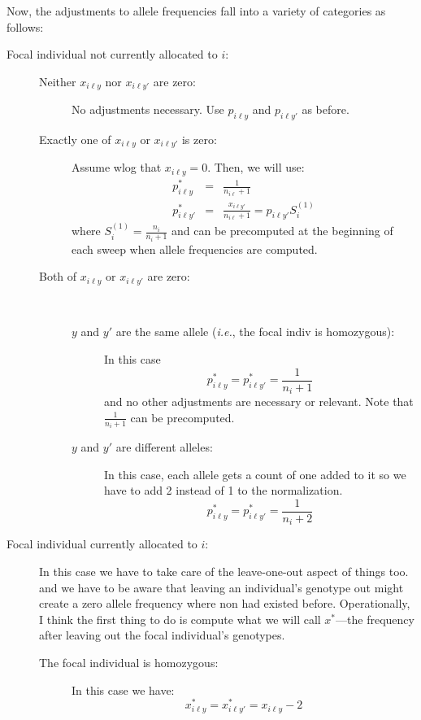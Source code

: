 \documentclass[11pt]{article}
\newcommand{\ie}{{\em i.e.},\xspace }
\begin{document}
Now, the adjustments to allele frequencies fall into a variety of categories as follows:
\begin{description}
	\item[Focal individual not currently allocated to $i$:] 
	\begin{description}
		\item [Neither $x_{i\ell y}$ nor $x_{i\ell y'}$ are zero:] No adjustments necessary.  Use $p_{i\ell y}$ and $p_{i\ell y'}$ as before.
		\item [Exactly one of $x_{i\ell y}$ or $x_{i\ell y'}$ is zero:] Assume wlog that $x_{i\ell y} = 0$.  Then, we will use:
		\begin{eqnarray*}
			p^*_{i\ell y} & = & \frac{1}{n_{i\ell} + 1} \\
			p^*_{i\ell y'} & = & \frac{x_{i\ell y'}}{n_{i\ell} + 1} = p_{i\ell y'} S_i^{(1)}
		\end{eqnarray*}
		where $S_i^{(1)} = \frac{n_i}{n_i + 1}$ and can be precomputed at the beginning of each sweep when allele frequencies are computed.
		\item [Both of $x_{i\ell y}$ or $x_{i\ell y'}$ are zero:] ~
		\begin{description}
			\item [$y$ and $y'$ are the same allele (\ie the focal indiv is homozygous):] In this case
			\[
				p^*_{i\ell y} = p^*_{i\ell y'} = \frac{1}{n_i + 1}
			\]
			and no other adjustments are necessary or relevant.  Note that $\frac{1}{n_i + 1}$ can be precomputed.
			\item [$y$ and $y'$ are different alleles:] In this case, each allele gets a count of one added to it
			so we have to add 2 instead of 1 to the normalization.
			\[
				p^*_{i\ell y} = p^*_{i\ell y'} = \frac{1}{n_i + 2}
			\]
		\end{description}
	\end{description}
	\item [Focal individual currently allocated to $i$:] In this case we have to take care of the leave-one-out aspect of things too.
	and we have to be aware that leaving an individual's genotype out might create a zero allele frequency where non had existed before.  
	Operationally, I think the first thing to do is compute what we will call $x^*$---the frequency after leaving out the focal
	individual's genotypes. 
	\begin{description}
		\item [The focal individual is homozygous:] In this case we have:
		\[
			x^*_{i\ell y} = x^*_{i\ell y'} = x_{i\ell y} - 2
\]
\end{description}
\end{description}
\end{document}
